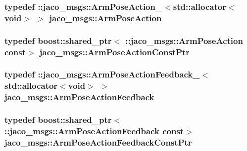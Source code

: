 \subsubsection[{\texorpdfstring{Arm\+Pose\+Action}{ArmPoseAction}}]{\setlength{\rightskip}{0pt plus 5cm}typedef \+::{\bf jaco\+\_\+msgs\+::\+Arm\+Pose\+Action\+\_\+}$<$std\+::allocator$<$void$>$ $>$ {\bf jaco\+\_\+msgs\+::\+Arm\+Pose\+Action}}\hypertarget{namespacejaco__msgs_a4c602e87a73fa73e367226c6d5547ebd}{}\label{namespacejaco__msgs_a4c602e87a73fa73e367226c6d5547ebd}
\subsubsection[{\texorpdfstring{Arm\+Pose\+Action\+Const\+Ptr}{ArmPoseActionConstPtr}}]{\setlength{\rightskip}{0pt plus 5cm}typedef boost\+::shared\+\_\+ptr$<$ \+::{\bf jaco\+\_\+msgs\+::\+Arm\+Pose\+Action} const$>$ {\bf jaco\+\_\+msgs\+::\+Arm\+Pose\+Action\+Const\+Ptr}}\hypertarget{namespacejaco__msgs_a7464e86fd856f667e5242d2466cb9262}{}\label{namespacejaco__msgs_a7464e86fd856f667e5242d2466cb9262}
\subsubsection[{\texorpdfstring{Arm\+Pose\+Action\+Feedback}{ArmPoseActionFeedback}}]{\setlength{\rightskip}{0pt plus 5cm}typedef \+::{\bf jaco\+\_\+msgs\+::\+Arm\+Pose\+Action\+Feedback\+\_\+}$<$std\+::allocator$<$void$>$ $>$ {\bf jaco\+\_\+msgs\+::\+Arm\+Pose\+Action\+Feedback}}\hypertarget{namespacejaco__msgs_a6f6f1bdac87560a87a57138102dbbf6e}{}\label{namespacejaco__msgs_a6f6f1bdac87560a87a57138102dbbf6e}
\subsubsection[{\texorpdfstring{Arm\+Pose\+Action\+Feedback\+Const\+Ptr}{ArmPoseActionFeedbackConstPtr}}]{\setlength{\rightskip}{0pt plus 5cm}typedef boost\+::shared\+\_\+ptr$<$ \+::{\bf jaco\+\_\+msgs\+::\+Arm\+Pose\+Action\+Feedback} const$>$ {\bf jaco\+\_\+msgs\+::\+Arm\+Pose\+Action\+Feedback\+Const\+Ptr}}\hypertarget{namespacejaco__msgs_a92dec13890096ba598d4d0c136574964}{}\label{namespacejaco__msgs_a92dec13890096ba598d4d0c136574964}
